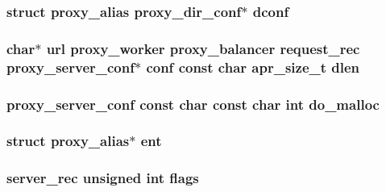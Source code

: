 \subsubsection[{\texorpdfstring{dconf}{dconf}}]{\setlength{\rightskip}{0pt plus 5cm}struct {\bf proxy\+\_\+alias} {\bf proxy\+\_\+dir\+\_\+conf}$\ast$ dconf}\hypertarget{group__MOD__PROXY_ga01226e8c588429d47a24e72bda63a5e3}{}\label{group__MOD__PROXY_ga01226e8c588429d47a24e72bda63a5e3}
\subsubsection[{\texorpdfstring{dlen}{dlen}}]{ char$\ast$ {\bf url} {\bf proxy\+\_\+worker} {\bf proxy\+\_\+balancer} {\bf request\+\_\+rec} {\bf proxy\+\_\+server\+\_\+conf}$\ast$ {\bf conf} const char {\bf apr\+\_\+size\+\_\+t} dlen}\hypertarget{group__MOD__PROXY_ga63ef3f66045cd6e20f6ea5a82363580d}{}\label{group__MOD__PROXY_ga63ef3f66045cd6e20f6ea5a82363580d}
\subsubsection[{\texorpdfstring{do\+\_\+malloc}{do_malloc}}]{ {\bf proxy\+\_\+server\+\_\+conf} const char const char {\bf int} do\+\_\+malloc}\hypertarget{group__MOD__PROXY_gaef29aa61c962c5e54a57f23da686176b}{}\label{group__MOD__PROXY_gaef29aa61c962c5e54a57f23da686176b}
\subsubsection[{\texorpdfstring{ent}{ent}}]{\setlength{\rightskip}{0pt plus 5cm}struct {\bf proxy\+\_\+alias}$\ast$ {\bf ent}}\hypertarget{group__MOD__PROXY_ga34404405efb1bb7f5b6dfd95e43d0181}{}\label{group__MOD__PROXY_ga34404405efb1bb7f5b6dfd95e43d0181}
\subsubsection[{\texorpdfstring{flags}{flags}}]{ {\bf server\+\_\+rec} unsigned {\bf int} flags}\hypertarget{group__MOD__PROXY_ga7637ce0c1acb585b26a1517887e19cec}{}\label{group__MOD__PROXY_ga7637ce0c1acb585b26a1517887e19cec}
